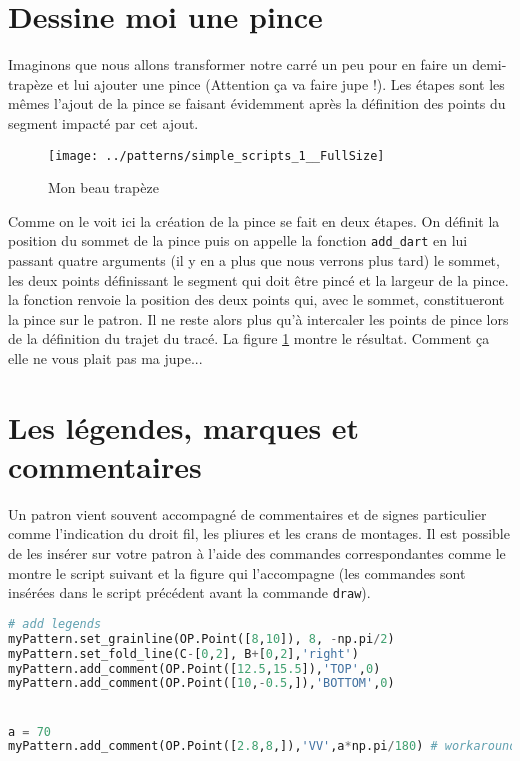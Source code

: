 \documentclass[11pt,a4paper]{report}
\begin{document}
\section{Dessine moi une pince}

Imaginons que nous allons transformer notre carré un peu pour en faire un demi-trapèze et lui ajouter une pince (Attention ça va faire jupe !). Les étapes sont les mêmes l'ajout de la pince se faisant évidemment après la définition des points du segment impacté par cet ajout.



\begin{figure}
\begin{center}
\texttt{[image: ../patterns/simple\_scripts\_1\_\_FullSize]}
\end{center}
\caption{Mon beau trapèze}
\label{fig:trapeze}
\end{figure}

Comme on le voit ici la création de la pince se fait en deux étapes. On définit la position du sommet de la pince puis on appelle la fonction \texttt{add\_dart} en lui passant quatre arguments (il y en a plus que nous verrons plus tard) le sommet, les deux points définissant le segment qui doit être pincé et la largeur de la pince. la fonction renvoie la position des deux points qui, avec le sommet, constitueront la pince sur le patron.  Il ne reste alors plus qu'à intercaler les points de pince lors de la définition du trajet du tracé. La figure \ref{fig:trapeze} montre le résultat. Comment ça elle ne vous plait pas ma jupe...

\section{Les légendes, marques et commentaires}

Un patron vient souvent accompagné de commentaires et de signes particulier comme l'indication du droit fil, les pliures et les crans de montages. Il est possible de les insérer sur votre patron à l'aide des commandes correspondantes comme le montre le script suivant et la figure qui l'accompagne (les commandes sont insérées dans le script précédent avant la commande \texttt{draw}).

\begin{lstlisting}[language=Python]
# add legends
myPattern.set_grainline(OP.Point([8,10]), 8, -np.pi/2)
myPattern.set_fold_line(C-[0,2], B+[0,2],'right')
myPattern.add_comment(OP.Point([12.5,15.5]),'TOP',0)
myPattern.add_comment(OP.Point([10,-0.5,]),'BOTTOM',0)


a = 70
myPattern.add_comment(OP.Point([2.8,8,]),'VV',a*np.pi/180) # workaround for notches
\end{lstlisting}
\end{document}
